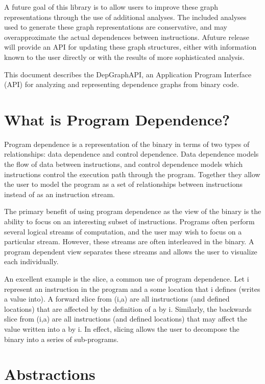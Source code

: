 \documentclass[12pt,titlepage]{article}
\begin{document}
A future goal of this library is to allow users to improve these graph
representations through the use of additional analyses. The included
analyses used to generate these graph representations are
conservative, and may overapproximate the actual dependences between
instructions. Afuture release will provide an API for updating these
graph structures, either with information known to the user directly
or with the results of more sophisticated analysis.

This document describes the DepGraphAPI, an Application Program
Interface (API) for analyzing and representing dependence graphs from
binary code.

\section{What is Program Dependence?}

Program dependence is a representation of the binary in terms of two
types of relationships: data dependence and control dependence. Data
dependence models the flow of data between instructions, and control
dependence models which instructions control the execution path
through the program. Together they allow the user to model the program
as a set of relationships between instructions instead of as an
instruction stream.  

The primary benefit of using program dependence as the view of the
binary is the ability to focus on an interesting subset of
instructions. Programs often perform several logical streams of
computation, and the user may wish to focus on a particular
stream. However, these streams are often interleaved in the binary. A
program dependent view separates these streams and allows the user to
visualize each individually.

An excellent example is the slice, a common use of program
dependence. Let i represent an instruction in the program and a some
location that i defines (writes a value into). A forward slice from
(i,a) are all instructions (and defined locations) that are affected
by the definition of a by i. Similarly, the backwards slice from (i,a)
are all instructions (and defined locations) that may affect the value
written into a by i. In effect, slicing allows the user to decompose
the binary into a series of sub-programs.  

\section{Abstractions}
\end{document}
